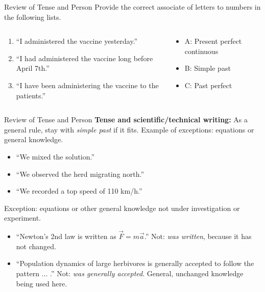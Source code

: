 \documentclass{beamer}
\begin{document}
\begin{frame}{Review of Tense and Person}
\small
\alert{Provide the correct associate of letters to numbers in the following lists.}
\begin{columns}[T]
\begin{column}{0.5\textwidth}
\begin{enumerate}
\item ``I administered the vaccine yesterday.''
\item ``I had administered the vaccine long before April 7th.''
\item ``I have been administering the vaccine to the patients.''
\end{enumerate}
\end{column}
\begin{column}{0.5\textwidth}
\begin{itemize}
\item A: Present perfect continuous
\item B: Simple past
\item C: Past perfect
\end{itemize}
\end{column}
\end{columns}
\end{frame}

\begin{frame}{Review of Tense and Person}
\small
\textbf{Tense and scientific/technical writing:} As a general rule, stay with \textit{simple past} if it fits.  Example of exceptions: equations or general knowledge.
\begin{itemize}
\item ``We mixed the solution.''
\item ``We observed the herd migrating north.''
\item ``We recorded a top speed of 110 km/h.''
\end{itemize}
Exception: equations or other general knowledge not under investigation or experiment.
\begin{itemize}
\item ``Newton's 2nd law is written as $\vec{F} = m\vec{a}$.'' Not: \textit{was written}, because it has not changed.
\item ``Population dynamics of large herbivores is generally accepted to follow the pattern ... .'' Not: \textit{was generally accepted}.  General, unchanged knowledge being used here.
\end{itemize}
\end{frame}
\end{document}
